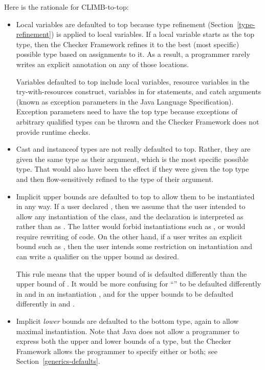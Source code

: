 Here is the rationale for CLIMB-to-top:

\begin{itemize}
\item
Local variables are defaulted to top because type refinement
(Section~\ref{type-refinement}) is applied to local variables.  If a local
variable starts as the top type, then the Checker Framework refines it to
the best (most specific) possible type based on assignments to it.  As a
result, a programmer rarely writes an explicit annotation on any of those
locations.

Variables defaulted to top include local variables, resource variables in the
try-with-resources construct, variables in for statements, and catch
arguments (known as exception parameters in the Java Language Specification).
Exception parameters need to have the top type because
exceptions of arbitrary qualified types can be thrown and the Checker Framework
does not provide runtime checks.

\item
Cast and instanceof types are not really defaulted to top.  Rather, they
are given the same type as their argument, which is the most specific
possible type.  That would also have been the effect if they were given the
top type and then flow-sensitively refined to the type of their argument.

\item
Implicit upper bounds are defaulted to top to allow them to be instantiated
in any way.  If a user declared , then
we assume that the user intended to allow any instantiation of the class,
and the declaration is interpreted as  rather than as .  The latter would forbid
instantiations such as , or would require
rewriting of code.  On the other hand, if a user writes an explicit bound
such as , then the user
intends some restriction on instantiation and can write a qualifier on the
upper bound as desired.

This rule means that the upper bound of  is defaulted
differently than the upper bound of .  It
would be more confusing for ``'' to be defaulted differently in  and in an
instantiation , and for the upper bounds to be defaulted
differently in 
and .

\item
Implicit \emph{lower} bounds are defaulted to the bottom type, again to allow
maximal instantiation.  Note that Java does not allow a programmer to
express both the upper and lower bounds of a type, but the Checker
Framework allows the programmer to specify either or both;
see Section~\ref{generics-defaults}.

\end{itemize}

